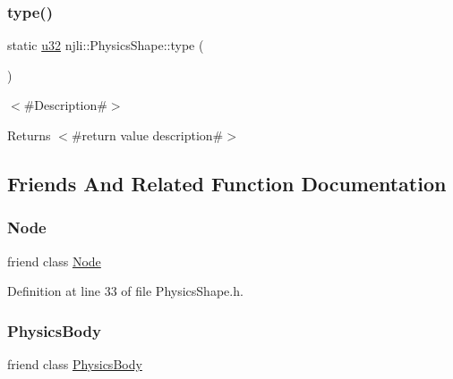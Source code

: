 \subsubsection{\texorpdfstring{type()}{type()}}
{\footnotesize\ttfamily static \mbox{\hyperlink{_util_8h_a10e94b422ef0c20dcdec20d31a1f5049}{u32}} njli\+::\+Physics\+Shape\+::type (\begin{DoxyParamCaption}{ }\end{DoxyParamCaption})\hspace{0.3cm}{\ttfamily [static]}}

$<$\#\+Description\#$>$

\begin{DoxyReturn}{Returns}
$<$\#return value description\#$>$ 
\end{DoxyReturn}


\subsection{Friends And Related Function Documentation}
\mbox{\label{classnjli_1_1_physics_shape_a6db9d28bd448a131448276ee03de1e6d}} 
\subsubsection{\texorpdfstring{Node}{Node}}
{\footnotesize\ttfamily friend class \mbox{\hyperlink{classnjli_1_1_node}{Node}}\hspace{0.3cm}{\ttfamily [friend]}}



Definition at line 33 of file Physics\+Shape.\+h.

\mbox{\label{classnjli_1_1_physics_shape_a5602338bf4d8e0e6baa58d3daa8dc90a}} 
\subsubsection{\texorpdfstring{Physics\+Body}{PhysicsBody}}
{\footnotesize\ttfamily friend class \mbox{\hyperlink{classnjli_1_1_physics_body}{Physics\+Body}}\hspace{0.3cm}{\ttfamily [friend]}}



